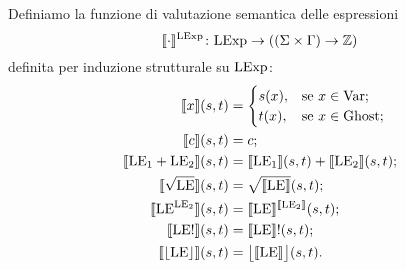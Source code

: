 \begin{definizione} 
Definiamo la funzione di valutazione semantica delle espressioni
\[
   \mathord{\llbracket \cdot \rrbracket ^{\mathrm{LExp}}}\colon\mathrm{LExp}\to((\Sigma \times \Gamma) \rightarrow \mathbb{Z})
\]
definita per induzione strutturale su $\mathrm{LExp}$:
\begin{align*}
   \llbracket x \rrbracket(s,t)
      &=
        \begin{cases}
                 s(x), &\text{se $x \in \mathrm{Var}$};\\
                 t(x), &\text{se $x \in \mathrm{Ghost}$};
        \end{cases}\\
   \llbracket  c \rrbracket(s,t)
     &=  c;\\
   \llbracket \mathrm{LE}_1 + \mathrm{LE}_2 \rrbracket(s,t)
     &= \llbracket \mathrm{LE}_1 \rrbracket(s,t) + \llbracket \mathrm{LE}_2 \rrbracket(s,t);\\
   \llbracket \sqrt{\mathrm{LE}} \rrbracket(s,t)
     &= \sqrt{\llbracket \mathrm{LE} \rrbracket}(s,t);\\
   \llbracket \mathrm{LE}^{\mathrm{LE}_2} \rrbracket(s,t)
     &= \llbracket \mathrm{LE} \rrbracket^{\llbracket \mathrm{LE}_2 \rrbracket}(s,t);\\
   \llbracket \mathrm{LE}! \rrbracket(s,t)
     &= \llbracket \mathrm{LE} \rrbracket!(s,t);\\
   \llbracket \lfloor \mathrm{LE} \rfloor \rrbracket(s,t)
     &= \bigl \lfloor \llbracket \mathrm{LE} \rrbracket \bigr \rfloor(s,t).
\end{align*}
\end{definizione}

